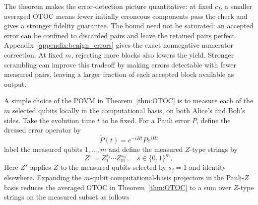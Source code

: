 \documentclass[onecolumn,prx,longbibliography,nofootinbib, superscriptaddress]{revtex4-2}
\theoremstyle{recap}
\begin{document}
The theorem makes the error-detection picture quantitative: at fixed $c_I$, a smaller averaged OTOC means fewer initially erroneous components pass the check and gives a stronger fidelity guarantee. The bound need not be saturated: an accepted error can be confined to discarded pairs and leave the retained pairs perfect. Appendix~\ref{appendix:benign_errors} gives the exact nonnegative numerator correction. At fixed $m$, rejecting more blocks also lowers the yield. Stronger scrambling can improve this tradeoff by making errors detectable with fewer measured pairs, leaving a larger fraction of each accepted block available as output.

A simple choice of the POVM in Theorem~\ref{thm:OTOC} is to measure each of the $m$ selected qubits locally in the computational basis, on both Alice's and Bob's sides. Take the evolution time $t$ to be fixed. For a Pauli error $P$, define the dressed error operator by 
\begin{equation}\label{eq:dressed_P}
    \tilde{P}(t)=e^{-iHt}Pe^{iHt}
\end{equation}
label the measured qubits $1,\ldots,m$ and define the measured $Z$-type strings by
\begin{equation}\label{eq:Pauli_Z}
    Z^s=Z_1^{s_1}\cdots Z_m^{s_m},\quad s\in\{0,1\}^m,
\end{equation}
Here $Z^s$ applies $Z$ to the measured qubits selected by $s_j=1$ and identity elsewhere. Expanding the $m$-qubit computational-basis projectors in the Pauli-$Z$ basis reduces the averaged OTOC in Theorem~\ref{thm:OTOC} to a sum over $Z$-type strings on the measured subset as follows
\end{document}
